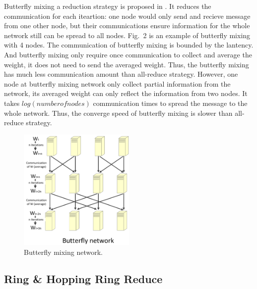 \documentclass{article}
\begin{document}
Butterfly mixing a reduction strategy is proposed in \cite{zhao2013butterfly}. It reduces the communication for each 
iteartion: one node would only send and recieve message from one other node, but their communications ensure information 
for the whole network still can be spread to all nodes. Fig.~2 is an example of butterfly mixing with 4 nodes. The communication of butterfly mixing is bounded by the lantency. And butterfly mixing only require once communication to collect and average the weight, it does not need to send the averaged weight. Thus, the butterfly mixing has much less communication amount than all-reduce strategy. However, one node at butterfly mixing network only collect partial information from the network, its averaged weight can only reflect the information from two nodes. It takes $log(number of nodes)$ communication times to spread the message to the whole network. Thus, the converge speed of butterfly mixing is slower than all-reduce strategy. 
\begin{figure}[htb]
  \centering
  \includegraphics[width=0.5\textwidth]{butterfly.jpg}
  \caption{Butterfly mixing network.}
\end{figure}

\subsection{Ring \& Hopping Ring Reduce}
\end{document}
